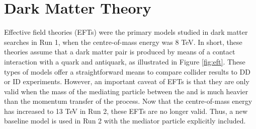 \label{chapter:theory}

\section{Dark Matter Theory}

Effective field theories (EFTs) \cite{Boveia:2016mrp} \cite{Beltran:2010ww} were the primary models studied in \etmissX dark matter searches in Run 1, when the centre-of-mass energy was 8 TeV. In short, these theories assume that a dark matter pair is produced by means of a contact interaction with a quark and antiquark, as illustrated in Figure \ref{fig:eft}. These types of models offer a straightforward means to compare collider results to DD or ID experiments. However, an important caveat of EFTs is that they are only valid when the mass of the mediating particle between the \chichi and \qq is much heavier than the momentum transfer of the process. Now that the centre-of-mass energy has increased to 13 TeV in Run 2, these EFTs are no longer valid. Thus, a new baseline model is used in Run 2 with the mediator particle explicitly included.


